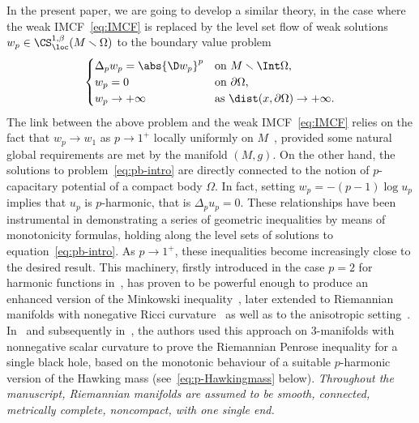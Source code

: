 In the present paper, we are going to develop a similar theory, in the case where the weak IMCF~\eqref{eq:IMCF} is replaced by the level set flow of weak solutions $w_p\in \CS^{1,\beta}_{\loc}(M \smallsetminus \Omega)$ to the boundary value problem
\begin{equation}
\label{eq:pb-intro}
 \begin{cases}
 \Delta_p w_p = \abs{\D w_p}^p &\text{on $M \smallsetminus \Int \Omega$,}\\
 w_p=0 & \text{on $\partial \Omega$,}\\
 w_p\to +\infty & \text{as $\dist(x,\partial \Omega) \to +\infty$.}
 \end{cases}
\end{equation}
The link between the above problem and the weak IMCF~\eqref{eq:IMCF} relies on the fact that $w_p\to w_1$ as $p\to 1^+$ locally uniformly on $M$~\cite{kotschwar_localgradientestimatesharmonic_2009,mari_flowlaplaceapproximationnew_2022, moser_inversemeancurvatureflow_2007,moser_inversemeancurvatureflow_2008}, provided some natural global requirements are met by the manifold $(M, g)$. On the other hand,
the solutions to problem~\eqref{eq:pb-intro} are directly connected to the notion of $p$-capacitary potential of a compact body $\Omega$. In fact, setting $w_p = -(p-1) \log u_p$ implies that $u_p$ is $p$-harmonic, that is $\Delta_p u_p = 0$. These relationships have been instrumental in demonstrating a series of geometric inequalities by means of monotonicity formulas, holding along the level sets of solutions to equation~\eqref{eq:pb-intro}. As $p \to 1^+$, these inequalities become increasingly close to the desired result.
This machinery, firstly introduced in the case $p=2$ for harmonic functions in~\cite{agostiniani_sharpgeometricinequalitiesclosed_2020, agostiniani_monotonicityformulaspotentialtheory_2020}, has proven to be powerful enough to produce an enhanced version of the Minkowski inequality~\cite{agostiniani_minkowskiinequalitiesnonlinearpotential_2022, fogagnolo_geometricaspectscapacitarypotentials_2019}, later extended to Riemannian manifolds with nonegative Ricci curvature~\cite{benatti_minkowskiinequalitycompleteriemannian_2022} as well as to the anisotropic setting~\cite{xia_anisotropiccapacityanisotropicminkowski_2022}.
 In~\cite{agostiniani_greenfunctionproofpositive_2021} and subsequently in~\cite{agostiniani_riemannianpenroseinequalitynonlinear_2022}, the authors used this approach on $3$-manifolds with nonnegative scalar curvature to prove the Riemannian Penrose inequality for a single black hole, based on the monotonic behaviour of a suitable $p$-harmonic version of the Hawking mass (see~\eqref{eq:p-Hawkingmass} below).
\emph{Throughout the manuscript, Riemannian manifolds are assumed to be smooth, connected, metrically complete, noncompact, with one single end.}


